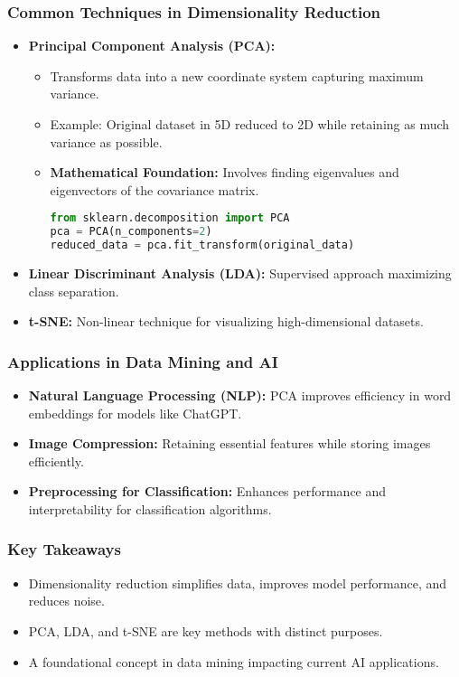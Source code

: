 \documentclass[aspectratio=169]{beamer}
\begin{document}
\begin{frame}[fragile]
    \frametitle{Common Techniques in Dimensionality Reduction}
    \begin{itemize}
        \item \textbf{Principal Component Analysis (PCA):}
            \begin{itemize}
                \item Transforms data into a new coordinate system capturing maximum variance.
                \item Example: Original dataset in 5D reduced to 2D while retaining as much variance as possible.
                \item \textbf{Mathematical Foundation:} Involves finding eigenvalues and eigenvectors of the covariance matrix.
                \begin{lstlisting}[language=Python]
from sklearn.decomposition import PCA
pca = PCA(n_components=2)
reduced_data = pca.fit_transform(original_data)
                \end{lstlisting}
            \end{itemize}
        \item \textbf{Linear Discriminant Analysis (LDA):} Supervised approach maximizing class separation.
        \item \textbf{t-SNE:} Non-linear technique for visualizing high-dimensional datasets.
    \end{itemize}
\end{frame}

\begin{frame}[fragile]
    \frametitle{Applications in Data Mining and AI}
    \begin{itemize}
        \item \textbf{Natural Language Processing (NLP):} PCA improves efficiency in word embeddings for models like ChatGPT.
        \item \textbf{Image Compression:} Retaining essential features while storing images efficiently.
        \item \textbf{Preprocessing for Classification:} Enhances performance and interpretability for classification algorithms.
    \end{itemize}
\end{frame}

\begin{frame}[fragile]
    \frametitle{Key Takeaways}
    \begin{itemize}
        \item Dimensionality reduction simplifies data, improves model performance, and reduces noise.
        \item PCA, LDA, and t-SNE are key methods with distinct purposes.
        \item A foundational concept in data mining impacting current AI applications.
    \end{itemize}
\end{frame}
\end{document}
